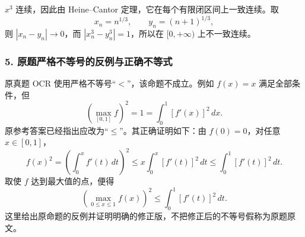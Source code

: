 \documentclass[11pt,fontset=fandol]{ctexart}
\begin{document}
\(x^3\) 连续，因此由 Heine--Cantor
定理，它在每个有限闭区间上一致连续。取 \[
x_n=n^{1/3},\qquad y_n=(n+1)^{1/3},
\] 则 \(|x_n-y_n|\to0\)，而 \(|x_n^3-y_n^3|=1\)，所以在 \([0,+\infty)\)
上不一致连续。

\subsubsection{5.
原题严格不等号的反例与正确不等式}\label{ux539fux9898ux4e25ux683cux4e0dux7b49ux53f7ux7684ux53cdux4f8bux4e0eux6b63ux786eux4e0dux7b49ux5f0f}

原真题 OCR 使用严格不等号``\(<\)''，该命题不成立。例如 \(f(x)=x\)
满足全部条件，但 \[
\left(\max_{[0,1]}f\right)^2=1=\int_0^1[f'(x)]^2\,dx.
\] 原参考答案已经指出应改为``\(\leq\)''。其正确证明如下：由
\(f(0)=0\)，对任意 \(x\in[0,1]\)， \[
f(x)^2=\left(\int_0^xf'(t)\,dt\right)^2\leq x\int_0^x[f'(t)]^2\,dt\leq\int_0^1[f'(t)]^2\,dt.
\] 取使 \(f\) 达到最大值的点，便得 \[
\boxed{\left(\max_{0\leq x\leq1}f(x)\right)^2\leq\int_0^1[f'(t)]^2\,dt.}
\]
这里给出原命题的反例并证明明确的修正版，不把修正后的不等号假称为原题原文。
\end{document}
